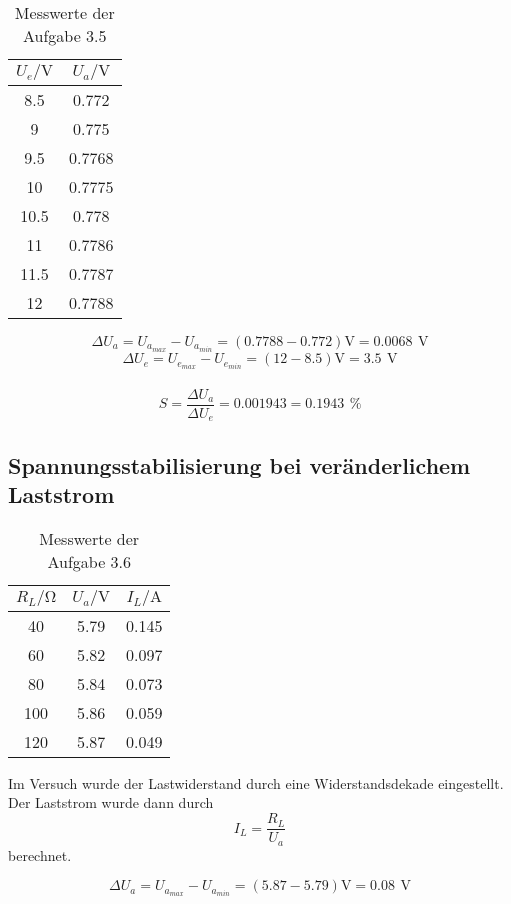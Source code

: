 \documentclass[a4paper, 12pt]{article}
\begin{document}
\begin{table}[H]
\begin{center}
\begin{tabular}{c|c}
\toprule
$U_e / \si{\volt} $ & $U_a / \si{\volt}$ \\\midrule
8.5                                               & 0.772                                             \\
9                                                 & 0.775                                             \\
9.5                                               & 0.7768                                            \\
10                                                & 0.7775                                            \\
10.5                                              & 0.778                                             \\
11                                                & 0.7786                                            \\
11.5                                              & 0.7787                                            \\
12                                                & 0.7788                 \\\bottomrule 
\end{tabular}
\end{center}
\caption{Messwerte der Aufgabe 3.5}
\end{table}

$$ \Delta U_a = U_{a_{max}} - U_{a_{min}} = (0.7788 - 0.772) \si{\volt} =
0.0068 \,\ \si{\volt}$$
$$ \Delta U_e = U_{e_{max}} - U_{e_{min}} = (12 - 8.5) \si{\volt} = 3.5 \,\ \si{\volt}$$\\
$$S = \frac{\Delta U_a}{\Delta U_e} = 0.001943 = 0.1943 \,\ \si{\percent}$$

\subsection{Spannungsstabilisierung bei veränderlichem Laststrom}
\begin{table}[H]
\begin{center}
\begin{tabular}{@{}c|c|c@{}}
\toprule
$R_L / \si{\ohm}$   & $U_a / \si{\volt}$ & $I_L / \si{\ampere}$                   \\ \midrule
40  & 5.79    & 0.145              \\
60  & 5.82    & 0.097                \\
80  & 5.84    & 0.073                \\
100 & 5.86    & 0.059 \\
120 & 5.87    & 0.049 \\ \bottomrule
\end{tabular}
\end{center}
\caption{Messwerte der Aufgabe 3.6}
\end{table}

Im Versuch wurde der Lastwiderstand durch eine Widerstandsdekade eingestellt.
Der Laststrom wurde dann durch
$$ I_L = \frac{R_L}{U_a} $$
\noindent berechnet.

$$ \Delta U_a = U_{a_{max}} - U_{a_{min}} = (5.87 - 5.79) \si{\volt} = 0.08 \,\
\si{\volt}$$
\end{document}
